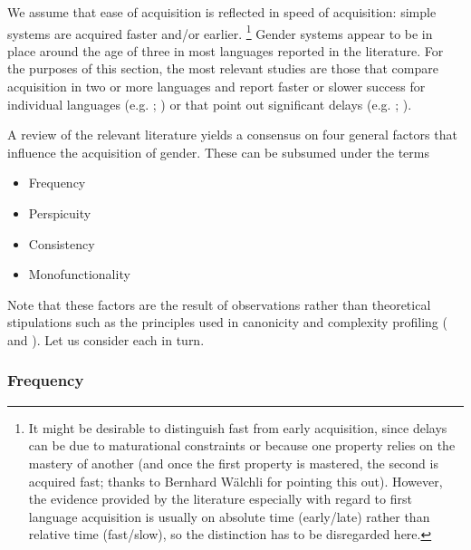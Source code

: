 \documentclass[output=collectionpaper]{langsci/langscibook}
\begin{document}
We assume that ease of acquisition is reflected in speed of acquisition: simple systems are acquired faster and/or earlier.%
\footnote{It might be desirable to distinguish fast from early acquisition, since delays can be due to maturational constraints or because one property relies on the mastery of another (and once the first property is mastered, the second is acquired fast; thanks to Bernhard Wälchli for pointing this out).  However, the evidence provided by the literature \textendash{} especially with regard to first language acquisition \textendash{} is usually on absolute time (early/late) rather than relative time (fast/slow), so the distinction has to be disregarded here.} %
Gender systems appear to be in place around the age of three in most languages reported in the literature. For the purposes of this section, the most relevant studies are those that compare acquisition in two or more languages and report faster or slower success for individual languages (e.g. \citealt{Mills1986}; \citealt{Eichler2013}) or that point out significant delays (e.g. \citealt{Mulford1985}; \citealt{Blom2008}).

A review of the relevant literature yields a consensus on four general factors that influence the acquisition of gender. These can be subsumed under the terms

\begin{itemize}
\item Frequency
\item Perspicuity
\item Consistency
\item Monofunctionality
\end{itemize}

Note that these factors are the result of observations rather than theoretical stipulations such as the principles used in canonicity and complexity profiling ( and ). Let us consider each in turn.


\subsubsection{Frequency}
\end{document}
